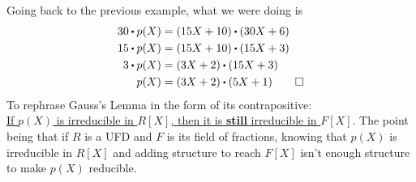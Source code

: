 \documentclass[../Main.tex]{subfiles}
\begin{document}
Going back to the previous example, what we were doing is
\begin{align*}
30\rdot p(X)&=(15X+10)\rdot (30X+6)\\
15\rdot p(X)&=(15X+10)\rdot (15X+3)\\
3\rdot p(X)&=(3X+2)\rdot (15X+3)\\
p(X) &= (3X+2)\rdot (5X+1)\qedhere
\end{align*}
To rephrase Gauss's Lemma in the form of its contrapositive: \\ \hyperref[lem:gauss]{If $p(X)$ is irreducible in $R[X]$, then it is \textbf{still} irreducible in $F[X]$}.  The point being that if $R$ is a UFD and $F$ is its field of fractions, knowing that $p(X)$ is irreducible in $R[X]$ and adding structure to reach $F[X]$ isn't enough structure to make $p(X)$ reducible.
\end{document}
